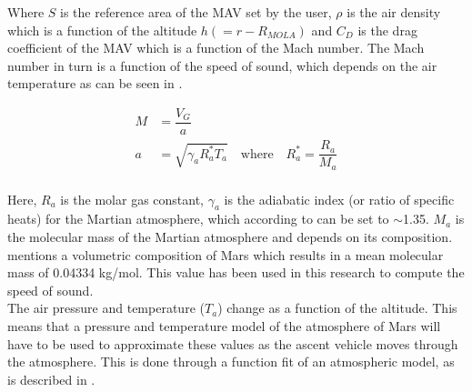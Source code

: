 \noindent
Where $S$ is the reference area of the \ac{MAV} set by the user, $\rho$ is the air density which is a function of the altitude $h\left(=r-R_{MOLA}\right)$ and $C_{D}$ is the drag coefficient of the \ac{MAV} which is a function of the Mach number. The Mach number in turn is a function of the speed of sound, which depends on the air temperature as can be seen in .





 \begin{equation} \label{eq:machAndSpeedOfSound}
\begin{split}
M &= \dfrac{V_{G}}{a} \\
a &= \sqrt{\gamma_{a}R_{a}^{*}T_{a}} \quad \text{where} \quad R_{a}^{*}=\dfrac{R_{a}}{M_{a}} \\
\end{split}
\end{equation}






\noindent
Here, $R_{a}$ is the molar gas constant, $\gamma_{a}$ is the adiabatic index (or ratio of specific heats) for the Martian atmosphere, which according to \cite{ho2002radio} can be set to $\sim$1.35. $M_{a}$ is the molecular mass of the Martian atmosphere and depends on its composition. \cite{williams2015} mentions a volumetric composition of Mars which results in a mean molecular mass of 0.04334 kg/mol. This value has been used in this research to compute the speed of sound.\\

\noindent
The air pressure and temperature ($T_{{a}}$) change as a function of the altitude. This means that a pressure and temperature model of the atmosphere of Mars will have to be used to approximate these values as the ascent vehicle moves through the atmosphere. This is done through a function fit of an atmospheric model, as is described in .\\

